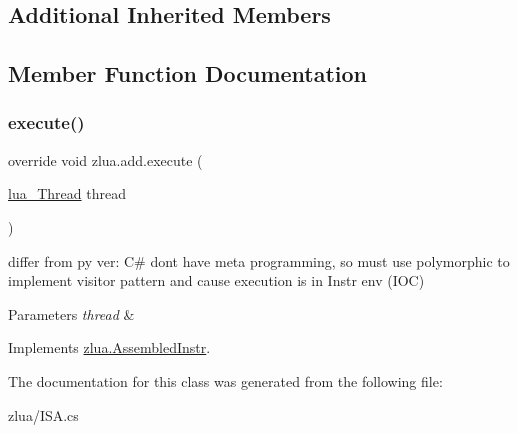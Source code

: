 \subsection*{Additional Inherited Members}


\subsection{Member Function Documentation}
\mbox{\label{classzlua_1_1add_a7a1a96e612bf700e73a640d4c4080179}} 
\subsubsection{\texorpdfstring{execute()}{execute()}}
{\footnotesize\ttfamily override void zlua.\+add.\+execute (\begin{DoxyParamCaption}\item[{\mbox{\hyperlink{classzlua_1_1lua___thread}{lua\+\_\+\+Thread}}}]{thread }\end{DoxyParamCaption})\hspace{0.3cm}{\ttfamily [virtual]}}



differ from py ver\+: C\# dont have meta programming, so must use polymorphic to implement visitor pattern and cause execution is in Instr env (I\+OC) 


\begin{DoxyParams}{Parameters}
{\em thread} & \\
\hline
\end{DoxyParams}


Implements \mbox{\hyperlink{classzlua_1_1_assembled_instr_a44e081c4565b90b75e4a67b8dd418feb}{zlua.\+Assembled\+Instr}}.



The documentation for this class was generated from the following file\+:\begin{DoxyCompactItemize}
\item 
zlua/I\+S\+A.\+cs\end{DoxyCompactItemize}
